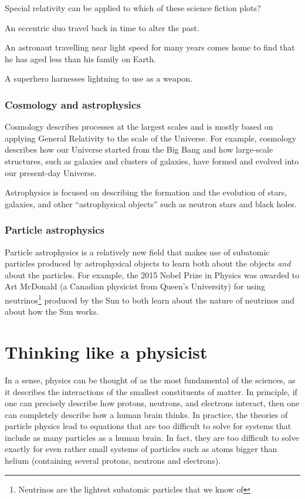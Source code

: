 \begin{checkpoint}
\begin{MCquestion}{Special relativity can be applied to which of these science fiction plots?}
\item An eccentric duo travel back in time to alter the past. 
\item An astronaut travelling near light speed for many years comes home to find that he has aged less than his family on Earth. \correct
\item A superhero harnesses lightning to use as a weapon.
\end{MCquestion}
\end{checkpoint}

\subsubsection{Cosmology and astrophysics} 
Cosmology describes processes at the largest scales and is mostly based on applying General Relativity to the scale of the Universe. For example, cosmology describes how our Universe started from the Big Bang and how large-scale structures, such as galaxies and clusters of galaxies, have formed and evolved into our present-day Universe. 


Astrophysics is focused on describing the formation and the evolution of stars, galaxies, and other ``astrophysical objects'' such as neutron stars and black holes. 

\subsubsection{Particle astrophysics}
Particle astrophysics is a relatively new field that makes use of subatomic particles produced by astrophysical objects to learn both about the objects \textit{and} about the particles. For example, the 2015 Nobel Prize in Physics was awarded to Art McDonald (a Canadian physicist from Queen's University) for using neutrinos\footnote{Neutrinos are the lightest subatomic particles that we know of} produced by the Sun to both learn about the nature of neutrinos and about how the Sun works. 

\section{Thinking like a physicist}
In a sense, physics can be thought of as the most fundamental of the sciences, as it describes the interactions of the smallest constituents of matter. In principle, if one can precisely describe how protons, neutrons, and electrons interact, then one can completely describe how a human brain thinks. In practice, the theories of particle physics lead to equations that are too difficult to solve for systems that include as many particles as a human brain. In fact, they are too difficult to solve exactly for even rather small systems of particles such as atoms bigger than helium (containing several protons, neutrons and electrons). 

